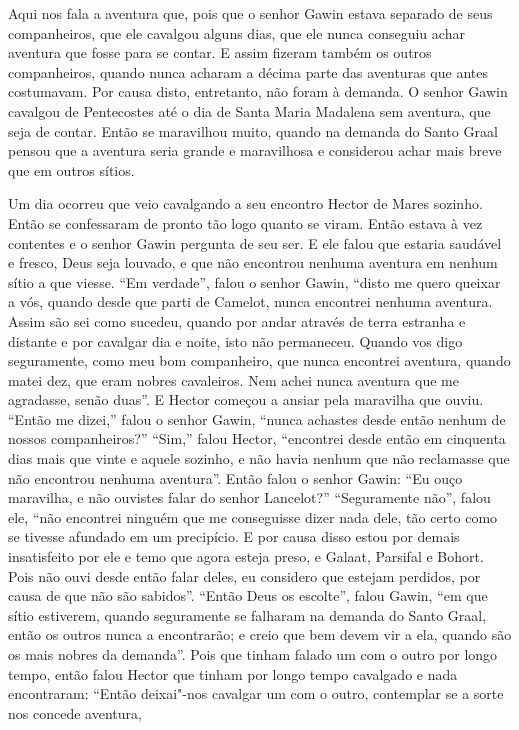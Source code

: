 Aqui nos fala a aventura que,  pois que o senhor Gawin estava separado
de seus companheiros, que ele cavalgou alguns dias, que ele nunca conseguiu
achar aventura que  fosse para se contar. E assim fizeram também os outros
companheiros, quando nunca acharam a décima parte das aventuras que antes
costumavam. Por causa disto, entretanto, não foram à demanda. O senhor Gawin
cavalgou de Pentecostes até o dia de Santa Maria Madalena sem aventura, que
seja de contar. Então se maravilhou muito, quando na demanda do Santo Graal
pensou que a aventura seria grande e maravilhosa e considerou achar mais breve
que em outros sítios.

Um dia ocorreu que veio cavalgando a seu encontro Hector de Mares sozinho. Então
se confessaram de pronto tão logo quanto se viram. Então estava à vez contentes
e o senhor Gawin pergunta de seu ser. E ele falou que estaria saudável e
fresco, Deus seja louvado, e que não encontrou nenhuma aventura em nenhum sítio
a que viesse. “Em verdade”, falou o senhor Gawin, “disto me quero queixar a
vós, quando desde que parti de Camelot, nunca encontrei nenhuma aventura. Assim
são sei como sucedeu, quando por andar através de terra estranha e distante e
por cavalgar dia e noite, isto não permaneceu. Quando vos digo seguramente,
como meu bom companheiro, que nunca encontrei aventura, quando matei dez, que
eram nobres cavaleiros. Nem achei nunca aventura que me agradasse, senão duas”.
E Hector começou a ansiar pela maravilha que ouviu. “Então me dizei,” falou o
senhor Gawin, “nunca achastes desde então nenhum de nossos companheiros?”
“Sim,” falou Hector, “encontrei desde então em cinquenta dias mais que vinte e
aquele sozinho, e não havia nenhum que não reclamasse que não encontrou nenhuma
aventura”. Então falou o senhor Gawin: “Eu ouço maravilha, e não ouvistes falar
do senhor Lancelot?” “Seguramente não”, falou ele, “não encontrei ninguém que
me conseguisse dizer nada dele, tão certo como se tivesse afundado em um
precipício. E por causa disso estou por demais insatisfeito por ele e temo que
agora esteja preso, e Galaat, Parsifal e Bohort. Pois não ouvi desde então
falar deles, eu considero que estejam perdidos, por causa de que não são
sabidos”. “Então Deus os escolte”, falou Gawin, “em que sítio estiverem,
quando seguramente se falharam na demanda do Santo Graal, então os outros nunca
a encontrarão; e creio que bem devem vir a ela, quando são os mais nobres da
demanda”. Pois que tinham falado um com o outro por longo tempo, então falou
Hector que tinham por longo tempo cavalgado e nada encontraram: “Então
deixai"-nos cavalgar um com o outro, contemplar se a sorte nos concede aventura,
